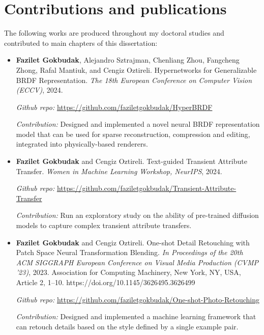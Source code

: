 \section{Contributions and publications}

The following works are produced throughout my doctoral studies and contributed to main chapters of this dissertation:

\begin{itemize}

\item \textbf{Fazilet Gokbudak}, Alejandro Sztrajman, Chenliang Zhou,  Fangcheng Zhong, Rafal Mantiuk, and Cengiz Oztireli. Hypernetworks for Generalizable BRDF Representation. \textit{The 18th European Conference on Computer Vision (ECCV)}, 2024.

\textit{Github repo:} \url{https://github.com/faziletgokbudak/HyperBRDF}

\textit{Contribution:} Designed and implemented a novel neural BRDF representation model that can be used for sparse reconstruction, compression and editing, integrated into physically-based renderers.

\item \textbf{Fazilet Gokbudak} and Cengiz Oztireli. Text-guided Transient Attribute Transfer. \textit{Women in Machine Learning Workshop, NeurIPS}, 2024.

\textit{Github repo:} \url{https://github.com/faziletgokbudak/Transient-Attribute-Transfer}

\textit{Contribution:} Run an exploratory study on the ability of pre-trained diffusion models to capture complex transient attribute transfers.

\item \textbf{Fazilet Gokbudak} and Cengiz Oztireli. One-shot Detail Retouching with Patch Space Neural Transformation Blending. \textit{In Proceedings of the 20th ACM SIGGRAPH European Conference on Visual Media Production (CVMP '23)}, 2023. Association for Computing Machinery, New York, NY, USA, Article 2, 1–10. https://doi.org/10.1145/3626495.3626499

\textit{Github repo:} \url{https://github.com/faziletgokbudak/One-shot-Photo-Retouching}

\textit{Contribution:} Designed and implemented a machine learning framework that can retouch details based on the style defined by a single example pair. 

\end{itemize}

